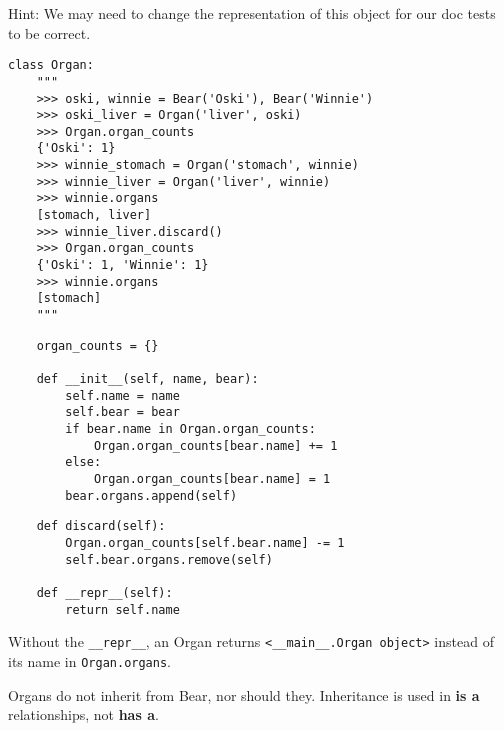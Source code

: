 \begin{parts}
\begin{blocksection}
Hint: We may need to change the representation of this object for our doc tests to be correct.


\begin{lstlisting}
class Organ:
    """
    >>> oski, winnie = Bear('Oski'), Bear('Winnie')
    >>> oski_liver = Organ('liver', oski)
    >>> Organ.organ_counts
    {'Oski': 1}
    >>> winnie_stomach = Organ('stomach', winnie)
    >>> winnie_liver = Organ('liver', winnie)
    >>> winnie.organs
    [stomach, liver]
    >>> winnie_liver.discard()
    >>> Organ.organ_counts
    {'Oski': 1, 'Winnie': 1}
    >>> winnie.organs
    [stomach]
    """
\end{lstlisting}
\begin{solution}[4 in]
\begin{lstlisting}
    organ_counts = {}

    def __init__(self, name, bear):
        self.name = name
        self.bear = bear
        if bear.name in Organ.organ_counts:
            Organ.organ_counts[bear.name] += 1
        else:
            Organ.organ_counts[bear.name] = 1
        bear.organs.append(self)
    \end{lstlisting}
\end{solution}
\end{blocksection}

\begin{solution}
\begin{lstlisting}
    def discard(self):
        Organ.organ_counts[self.bear.name] -= 1
        self.bear.organs.remove(self)

    def __repr__(self):
        return self.name
\end{lstlisting}

Without the \lstinline{__repr__}, an Organ returns \lstinline{<__main__.Organ object>} instead of its name in \lstinline{Organ.organs}.

Organs do not inherit from Bear, nor should they. Inheritance is used in \textbf{is a} relationships, not \textbf{has a}.
\end{solution}


\end{parts}
